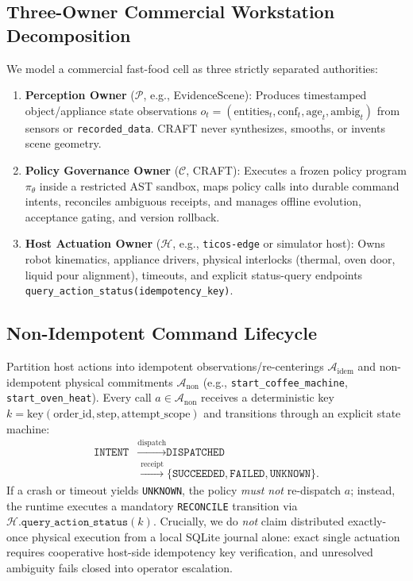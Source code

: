 \documentclass[10pt,journal]{IEEEtran}
\begin{document}
\subsection{Three-Owner Commercial Workstation Decomposition}
We model a commercial fast-food cell as three strictly separated authorities:
\begin{enumerate}
    \item \textbf{Perception Owner} ($\mathcal{P}$, e.g., EvidenceScene): Produces timestamped object/appliance state observations $o_t = (\text{entities}_t, \text{conf}_t, \text{age}_t, \text{ambig}_t)$ from sensors or \texttt{recorded\_data}. CRAFT never synthesizes, smooths, or invents scene geometry.
    \item \textbf{Policy Governance Owner} ($\mathcal{C}$, CRAFT): Executes a frozen policy program $\pi_\theta$ inside a restricted AST sandbox, maps policy calls into durable command intents, reconciles ambiguous receipts, and manages offline evolution, acceptance gating, and version rollback.
    \item \textbf{Host Actuation Owner} ($\mathcal{H}$, e.g., \texttt{ticos-edge} or simulator host): Owns robot kinematics, appliance drivers, physical interlocks (thermal, oven door, liquid pour alignment), timeouts, and explicit status-query endpoints \texttt{query\_action\_status(idempotency\_key)}.
\end{enumerate}

\subsection{Non-Idempotent Command Lifecycle}
Partition host actions into idempotent observations/re-centerings $\mathcal{A}_{\mathrm{idem}}$ and non-idempotent physical commitments $\mathcal{A}_{\mathrm{non}}$ (e.g., \texttt{start\_coffee\_machine}, \texttt{start\_oven\_heat}). Every call $a \in \mathcal{A}_{\mathrm{non}}$ receives a deterministic key $k = \text{key}(\text{order\_id}, \text{step}, \text{attempt\_scope})$ and transitions through an explicit state machine:
\begin{equation}
\begin{aligned}
    \texttt{INTENT} &\xrightarrow{\text{dispatch}} \texttt{DISPATCHED} \\
    &\xrightarrow{\text{receipt}} \{\texttt{SUCCEEDED}, \texttt{FAILED}, \texttt{UNKNOWN}\}.
\end{aligned}
\end{equation}
If a crash or timeout yields \texttt{UNKNOWN}, the policy \emph{must not} re-dispatch $a$; instead, the runtime executes a mandatory \texttt{RECONCILE} transition via $\mathcal{H}.\texttt{query\_action\_status}(k)$. Crucially, we do \emph{not} claim distributed exactly-once physical execution from a local SQLite journal alone: exact single actuation requires cooperative host-side idempotency key verification, and unresolved ambiguity fails closed into operator escalation.
\end{document}
